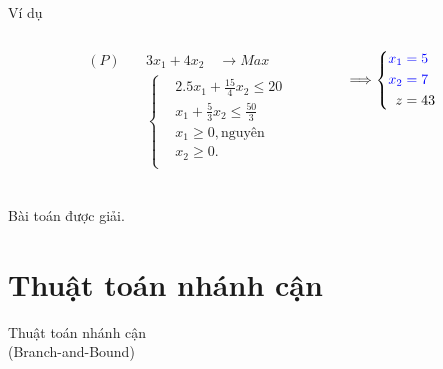 \documentclass{beamer}
\begin{document}
\begin{frame}{Ví dụ}
    \begin{columns}
    \begin{column}{0.1\textwidth}
    \end{column}
    \begin{column}{0.4\textwidth}
        \begin{equation*}
        \begin{split}
            (P) \quad & 3x_1 + 4x_2 \quad \longrightarrow Max \\
            & \left\{\begin{split}
            & 2.5x_1 + \frac{15}{4}x_2 \leq 20 \\
            & x_1 + \frac{5}{3}x_2 \leq \frac{50}{3} \\
            &x_1 \geq 0, \text{nguyên} \\
            &x_2 \geq 0. \\
            \end{split}\right. \\
        \end{split}
        \end{equation*}
    \end{column}
    \begin{column}{0.4\textwidth}
        \begin{equation*}
            \Longrightarrow
            \left\{\begin{split}
            \color{blue} x_1 &\color{blue} = 5 \\
            \color{blue} x_2 &\color{blue} = 7 \\
            z& =43
        \end{split}\right.
        \end{equation*}
    \end{column}
    \begin{column}{0.1\textwidth}
    \end{column}
    \end{columns}
    \vspace{1cm}
    \center
    \Large
    Bài toán được giải.
\end{frame}

\section{Thuật toán nhánh cận}
\begin{frame}
   \center
   \huge Thuật toán nhánh cận \\ (Branch-and-Bound)
\end{frame}
\end{document}
